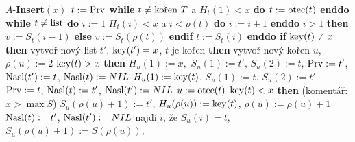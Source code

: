 $A$-{\bf Insert$(x)$\newline 
$t:=\operatorname{Prv}$\newline
while} $t\ne\text{\rm ko\v ren }T$ a $H_t(1)<x$ {\bf do $t:=\operatorname{otec}(t)$ enddo\newline 
while} $t\ne\text{\rm list}$ {\bf do}\newline 
\phantom{---}$i:=1$\newline 
\phantom{---}{\bf while} $H_t(i)<x$ a $i<\rho (t)$ {\bf do} $i:=i+1$ {\bf enddo}\newline 
\phantom{---}{\bf if} $i>1$ {\bf then} $v:=S_t(i-1)$ {\bf else} $v:=S_t(\rho (t))$ {\bf endif}\newline 
\phantom{---}$t:=S_t(i)$\newline 
{\bf enddo\newline 
if} $\operatorname{key}(t)\ne x$ {\bf then\newline }
\phantom{---}vytvo\v r nov\'y list $t'$, $\operatorname{key}(t')=x$,\newline
\phantom{---}{\bf if} $t$ je ko\v ren {\bf then}\newline 
\phantom{------}vytvo\v r nov\'y ko\v ren $u$, $\rho (u):=2$\newline 
\phantom{------}{\bf if} $\operatorname{key}(t)>x$ {\bf then}\newline 
\phantom{---------}$H_u(1):=x,$ $S_u(1):=t'$, $S_u(2):=t$,\newline
\phantom{---------}$\operatorname{Prv}:=t'$, $\operatorname{Nasl}(t'):=t$, $\operatorname{Nasl}(t):=NIL$\newline 
\phantom{------}{\bf else}\newline 
\phantom{---------}$H_u(1):=\operatorname{key}(t)$, $S_u(1):=t$, $S_u(2):=t'$\newline
\phantom{---------}$\operatorname{Prv}:=t$, $\operatorname{Nasl}(t):=t'$, $\operatorname{Nasl}(t'):=NIL$\newline 
\phantom{------}{\bf endif}\newline 
\phantom{---}{\bf else}\newline 
\phantom{------}$u:=\operatorname{otec}(t)$\newline 
\phantom{------}{\bf if} $\operatorname{key}(t)<x$ {\bf then}\newline  
(koment\'a\v r: $x>\max S$)\newline 
\phantom{---------}$S_u(\rho (u)+1):=t'$, $H_u(\rho(u)):=\operatorname{key}(t)$, $\rho(u):=\rho(u)+1$\newline 
\phantom{---------}$\operatorname{Nasl}(t):=t'$, $\operatorname{Nasl}(t'):=NIL$\newline 
\phantom{------}{\bf else}\newline 
\phantom{---------}najdi $i$, \v ze $S_u(i)=t$, $S_u(\rho(u)+1):=S(\rho(u))$,\newline 
